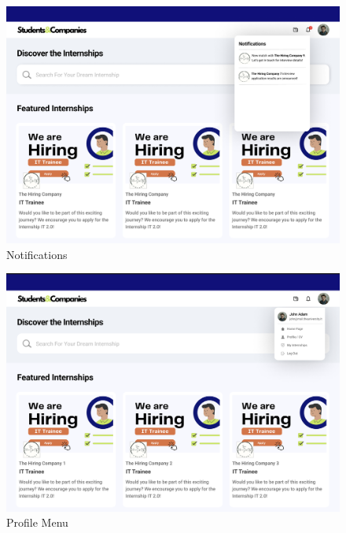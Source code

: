 \documentclass{article}
\begin{document}
\begin{figure}[H]
    \centering
    \includegraphics[scale = 0.40]{figures/UserInterfaces/Notifications.png}
    \caption{Notifications}
     \centering
\end{figure}

\begin{figure}[H]
    \centering
    \includegraphics[scale = 0.40]{figures/UserInterfaces/ProfilMenu.png}
    \caption{Profile Menu}
     \centering
\end{figure}
\end{document}
